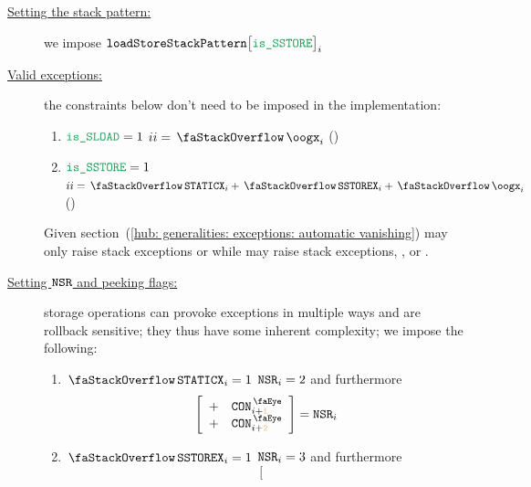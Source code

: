 \begin{center}
\end{center}

\begin{description}
	\item[\underline{Setting the stack pattern:}] we impose $\loadStoreSP\big[ \locIsSstore \big]_{i}$
	\item[\underline{Valid exceptions:}]
		the constraints below don't need to be imposed in the implementation:
		\begin{enumerate}
			\item \If $\locIsSload  = 1$ \Then $\xAhoy_{i} = \stackOogx_{i}$ \quad (\trash)
			\item \If $\locIsSstore = 1$ \Then $\xAhoy_{i} = \stackStaticx_{i} + \stackSstorex_{i} + \stackOogx_{i}$ \quad (\trash)
		\end{enumerate}
		\saNote{} Given section~(\ref{hub: generalities: exceptions: automatic vanishing})
		 may only raise stack exceptions or \oogxSH{}
		while  may raise stack exceptions, \staticxSH{}, \sstorexSH{} or \oogxSH{}.
	\item[\underline{Setting $\texttt{NSR}$ and peeking flags:}]
		\label{hub: instruction handling: storage: non stack rows and peeking flags}
		storage operations can provoke exceptions in multiple ways and are rollback sensitive;
		they thus have some inherent complexity;
		we impose the following:
		\begin{enumerate}
			\item \If $\stackStaticx_{i} = 1$ \Then $\texttt{NSR}_{i} = 2$ and furthermore
				\[
					\left[ \begin{array}{cr}
						+ & \peekContext _{i + \locFirstCon}         \\
						+ & \peekContext _{i + \locStaticxSecondCon} \\
					\end{array} \right]
					=
					\nonStackRows_{i}
				\]
			\item \If $\stackSstorex_{i} = 1$ \Then $\texttt{NSR}_{i} = 3$ and furthermore
				\[
					\left[ \begin{array}{cr}

\end{array}\]
\end{enumerate}
\end{description}

